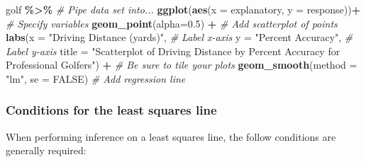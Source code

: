 \documentclass[
]{report}
\newenvironment{Shaded}{\begin{snugshade}}{\end{snugshade}}
\newcommand{\AttributeTok}[1]{\textcolor[rgb]{0.13,0.29,0.53}{#1}}
\newcommand{\CommentTok}[1]{\textcolor[rgb]{0.56,0.35,0.01}{\textit{#1}}}
\newcommand{\ConstantTok}[1]{\textcolor[rgb]{0.56,0.35,0.01}{#1}}
\newcommand{\FloatTok}[1]{\textcolor[rgb]{0.00,0.00,0.81}{#1}}
\newcommand{\FunctionTok}[1]{\textcolor[rgb]{0.13,0.29,0.53}{\textbf{#1}}}
\newcommand{\NormalTok}[1]{#1}
\newcommand{\SpecialCharTok}[1]{\textcolor[rgb]{0.81,0.36,0.00}{\textbf{#1}}}
\newcommand{\StringTok}[1]{\textcolor[rgb]{0.31,0.60,0.02}{#1}}
\begin{document}
\begin{Shaded}
\begin{Highlighting}[]
\NormalTok{golf }\SpecialCharTok{\%\textgreater{}\%} \CommentTok{\# Pipe data set into...}
\FunctionTok{ggplot}\NormalTok{(}\FunctionTok{aes}\NormalTok{(}\AttributeTok{x =}\NormalTok{ explanatory, }\AttributeTok{y =}\NormalTok{ response))}\SpecialCharTok{+}  \CommentTok{\# Specify variables}
  \FunctionTok{geom\_point}\NormalTok{(}\AttributeTok{alpha=}\FloatTok{0.5}\NormalTok{) }\SpecialCharTok{+}  \CommentTok{\# Add scatterplot of points}
  \FunctionTok{labs}\NormalTok{(}\AttributeTok{x =} \StringTok{"Driving Distance (yards)"}\NormalTok{,  }\CommentTok{\# Label x{-}axis}
       \AttributeTok{y =} \StringTok{"Percent Accuracy"}\NormalTok{,  }\CommentTok{\# Label y{-}axis}
       \AttributeTok{title =} \StringTok{"Scatterplot of Driving Distance by Percent Accuracy}
\StringTok{       for Professional Golfers"}\NormalTok{) }\SpecialCharTok{+} 
               \CommentTok{\# Be sure to tile your plots}
  \FunctionTok{geom\_smooth}\NormalTok{(}\AttributeTok{method =} \StringTok{"lm"}\NormalTok{, }\AttributeTok{se =} \ConstantTok{FALSE}\NormalTok{)  }\CommentTok{\# Add regression line}
\end{Highlighting}
\end{Shaded}

\subsubsection*{Conditions for the least squares line}\label{conditions-for-the-least-squares-line}

When performing inference on a least squares line, the follow conditions are generally required:
\end{document}
